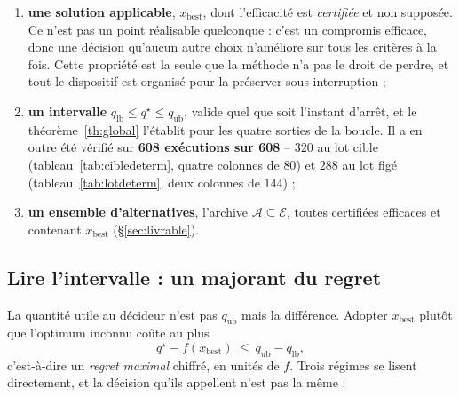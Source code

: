 \documentclass[11pt,a4paper]{article}
\theoremstyle{plain}
\theoremstyle{remark}
\newcommand{\Ecal}{\mathcal{E}}
\newcommand{\Acal}{\mathcal{A}}
\newcommand{\qs}{q^{\star}}
\begin{document}
\begin{enumerate}[leftmargin=*,itemsep=3pt]
\item \textbf{une solution applicable}, $x_{\text{best}}$, dont l'efficacité
      est \emph{certifiée} et non supposée. Ce n'est pas un point réalisable
      quelconque : c'est un compromis efficace, donc une décision qu'aucun
      autre choix n'améliore sur tous les critères à la fois. Cette propriété
      est la seule que la méthode n'a pas le droit de perdre, et tout le
      dispositif est organisé pour la préserver sous interruption ;
\item \textbf{un intervalle} $q_{\text{lb}}\le\qs\le q_{\text{ub}}$, valide
      quel que soit l'instant d'arrêt, et le théorème~\ref{th:global}
      l'établit pour les quatre sorties de la boucle. Il a en outre été
      vérifié sur \textbf{608 exécutions sur 608} -- $320$ au lot cible
      (tableau~\ref{tab:cibledeterm}, quatre colonnes de $80$) et $288$
      au lot figé (tableau~\ref{tab:lotdeterm}, deux colonnes de $144$) ;
\item \textbf{un ensemble d'alternatives}, l'archive $\Acal\subseteq\Ecal$,
      toutes certifiées efficaces et contenant $x_{\text{best}}$
      (\S\ref{sec:livrable}).
\end{enumerate}

\subsection{Lire l'intervalle : un majorant du regret}

La quantité utile au décideur n'est pas $q_{\text{ub}}$ mais la différence.
Adopter $x_{\text{best}}$ plutôt que l'optimum inconnu coûte au plus
\[
  \qs - f(x_{\text{best}})\ \le\ q_{\text{ub}} - q_{\text{lb}},
\]
c'est-à-dire un \emph{regret maximal} chiffré, en unités de $f$. Trois
régimes se lisent directement, et la décision qu'ils appellent n'est pas la
même :
\end{document}
